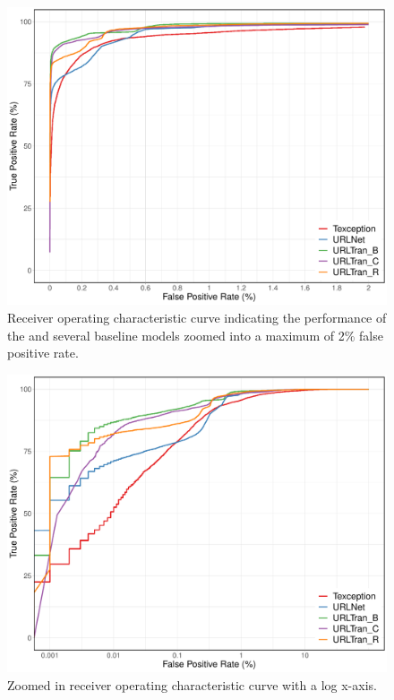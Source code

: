 \begin{figure}
    \centering
	\includegraphics[width=0.7\linewidth]{urltran/figures/roc_0_02_R.pdf}
	\caption{Receiver operating characteristic curve indicating the performance of the \URLTranSys and several baseline models zoomed into a maximum of 2\% false positive rate.}
	\label{fig:urltran:transformer2}
\end{figure}

\begin{figure}
    \centering
	\includegraphics[width=0.7\linewidth]{urltran/figures/log_roc_R.pdf}
	\caption{Zoomed in receiver operating characteristic curve with a log x-axis.}
	\label{fig:urltran:log_transformer2}
\end{figure}



